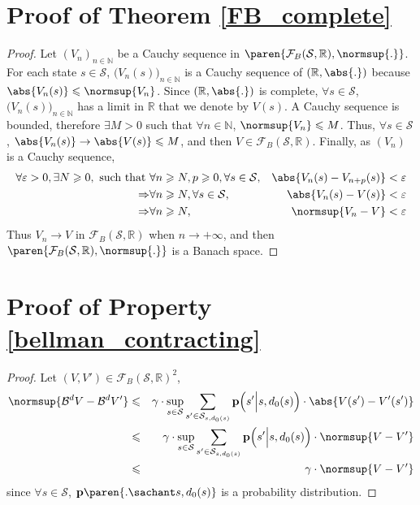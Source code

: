 \section{Proof of Theorem \ref{FB_complete}}
\begin{proof} 
Let $(V_n)_{n \in \mathbb{N}}$ be a Cauchy sequence 
in $\paren{ \mathcal{F}_{B}(\mathcal{S},\mathbb{R}), \normsup{.}}$. 
For each state $s \in \mathcal{S}$, 
$\Big(V_n(s)\Big)_{n \in \mathbb{N}}$
is a Cauchy sequence of $(\mathbb{R},\abs{.})$
because $\abs{V_n(s)} \leqslant \normsup{V_n}$. 
Since $(\mathbb{R},\abs{.})$ is complete, 
$\forall s \in \mathcal{S}$, $\Big(V_n(s)\Big)_{n \in \mathbb{N}}$ 
has a limit in $\mathbb{R}$
that we denote by $V(s)$. 
A Cauchy sequence is bounded, 
therefore $\exists M>0$ 
such that $\forall n \in \mathbb{N}$, 
$\normsup{V_n} \leqslant M $. 
Thus, $\forall s \in \mathcal{S}$, 
$\abs{ V_n(s) } \rightarrow \abs{ V(s) } \leqslant M$, 
and then $V \in \mathcal{F}_{B}(\mathcal{S},\mathbb{R})$.
Finally, as $(V_n)$ is a Cauchy sequence,
\begin{eqnarray*}
\forall \varepsilon >0, \exists N \geqslant 0, \mbox{ such that } &  \forall n \geqslant N,p \geqslant 0,  \forall s \in \mathcal{S}, & \abs{ V_n(s) - V_{n+p}(s) } < \varepsilon \\
\Rightarrow & \forall n \geqslant N, \forall s \in \mathcal{S}, & \abs{ V_n(s) - V(s) } < \varepsilon \\
\Rightarrow & \forall n \geqslant N, & \normsup{V_n - V} < \varepsilon 
\end{eqnarray*}
Thus $V_n \longrightarrow V$ in $\mathcal{F}_{B}(\mathcal{S},\mathbb{R})$ 
when $n \rightarrow + \infty$, 
and then $\paren{\mathcal{F}_{B}(\mathcal{S},\mathbb{R}),\normsup{.}}$ is a Banach space.
\end{proof}



\section{Proof of Property \ref{bellman_contracting}}
\begin{proof}
Let $(V,V') \in \mathcal{F}_{B} (\mathcal{S},\mathbb{R})^2$,
\begin{eqnarray*}
\normsup{\mathcal{B}^d V - \mathcal{B}^d V'} & \leqslant &  \gamma \cdot \sup_{s \in \mathcal{S}} \sum_{s' \in \mathcal{S}_{s,d_0(s)}} \textbf{p} \Big( s' \Big\vert s,d_0(s) \Big) \cdot \abs{ V(s')-V'(s')} \\
& \leqslant &  \gamma \cdot \sup_{s \in \mathcal{S}} \sum_{s' \in \mathcal{S}_{s,d_0(s)}} \textbf{p} \Big(s' \Big\vert s,d_0(s) \Big) \cdot \normsup{ V-V'} \\ 
& \leqslant &  \gamma \cdot \normsup{ V-V'} 
\end{eqnarray*}
since $\forall s \in \mathcal{S}$, $\textbf{p} \paren{. \sachant s,d_0(s)}$
is a probability distribution.
\end{proof}



